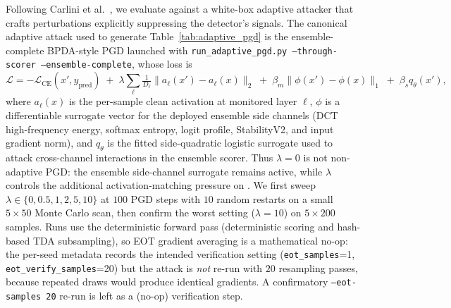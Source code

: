 Following Carlini et al.~\cite{carlini2019evaluating}, we evaluate
\prism against a white-box adaptive attacker that crafts perturbations
explicitly suppressing the detector's signals. The canonical adaptive
attack used to generate Table~\ref{tab:adaptive_pgd} is the
ensemble-complete BPDA-style PGD launched with
\texttt{run\_adaptive\_pgd.py --through-scorer --ensemble-complete},
whose loss is
\[
  \mathcal{L} = -\mathcal{L}_\text{CE}(x', y_\text{pred})
    \;+\; \lambda \sum_{\ell} \tfrac{1}{D_\ell}\|a_\ell(x') - a_\ell(x)\|_2
    \;+\; \beta_m \|\phi(x')-\phi(x)\|_1
    \;+\; \beta_s q_\theta(x'),
\]
where $a_\ell(x)$ is the per-sample clean activation at monitored layer
$\ell$, $\phi$ is a differentiable surrogate vector for the deployed
ensemble side channels (DCT high-frequency energy, softmax entropy,
logit profile, StabilityV2, and input gradient norm), and
$q_\theta$ is the fitted side-quadratic logistic surrogate used to
attack cross-channel interactions in the ensemble scorer. Thus
$\lambda{=}0$ is not non-adaptive PGD: the ensemble side-channel
surrogate remains active, while $\lambda$ controls the additional
activation-matching pressure on \tamm. We first sweep
$\lambda \in \{0, 0.5, 1, 2, 5, 10\}$ at $100$ PGD steps with $10$ random
restarts on a small $5{\times}50$ Monte Carlo scan, then confirm the
worst setting ($\lambda{=}10$) on $5{\times}200$ samples. Runs use the
deterministic \prism forward pass (deterministic scoring and
hash-based TDA subsampling), so EOT gradient averaging is a mathematical
no-op: the per-seed metadata records the intended verification setting
(\texttt{eot\_samples}=1, \texttt{eot\_verify\_samples}=20) but the attack
is \emph{not} re-run with $20$ resampling passes, because repeated draws
would produce identical gradients. A confirmatory
\texttt{--eot-samples 20} re-run is left as a (no-op) verification step.

\begin{table}[h]
\centering
\small

\caption{%
  Ensemble-complete adaptive PGD (100 steps, 10 restarts, 5 seeds).
  The scan rows use $n{=}50$/seed to select the worst $\lambda$; the
  confirm row reruns $\lambda{=}10$ at $n{=}200$/seed. Overall TPR falls
  to $0.479$ on the confirmation, but among adversarials that actually
  fool the backbone the detector still catches $0.866$; the undetected
  successful-attack rate is $0.074$. The independent clean calibration
  gate passes at L1/L2/L3 FPR $0.079/0.026/0.003$.
}
\label{tab:adaptive_pgd}
\end{table}

